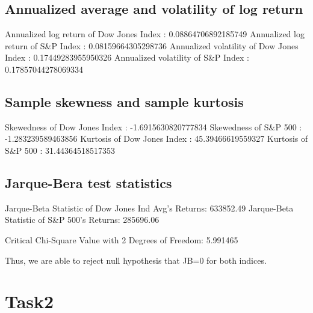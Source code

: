 \documentclass[a4paper]{article}
\begin{document}
\subsection{Annualized average and volatility of log return}
\begin{flushleft}
Annualized log return of Dow Jones Index : 0.08864706892185749 \linebreak 
Annualized log return of S\&P Index : 0.08159664305298736 \linebreak 
Annualized volatility of Dow Jones Index : 0.17449283955950326 \linebreak 
Annualized volatility of S\&P Index : 0.17857044278069334 \linebreak 
\end{flushleft}

\subsection{Sample skewness and sample kurtosis}
\begin{flushleft}
	Skewedness of Dow Jones Index : -1.6915630820777834 \linebreak 
	Skewedness of S\&P 500 : -1.283239589463856 \linebreak 
	Kurtosis of Dow Jones Index : 45.39466619559327 \linebreak 
	Kurtosis of S\&P 500 : 31.44364518517353 \linebreak 
\end{flushleft}

\subsection{Jarque-Bera test statistics}
\begin{flushleft}
Jarque-Beta Statistic of Dow Jones Ind Avg's Returns: 633852.49\linebreak
Jarque-Beta Statistic of S\&P 500's Returns: 285696.06\linebreak

Critical Chi-Square Value with 2 Degrees of Freedom: 5.991465\linebreak

Thus, we are able to reject null hypothesis that JB=0 for both indices.\linebreak
\end{flushleft}

\section{Task2}
\end{document}
